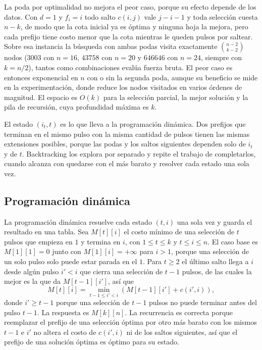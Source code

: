La poda por optimalidad no mejora el peor caso, porque su efecto depende de los datos. Con $d = 1$ y $f_i = i$ todo salto $c(i,j)$ vale $j - i - 1$ y toda selección cuesta $n - k$, de modo que la cota inicial ya es óptima y ninguna hoja la mejora, pero cada prefijo tiene costo menor que la cota mientras le queden pulsos por saltear. Sobre esa instancia la búsqueda con ambas podas visita exactamente $\binom{n-2}{k-2}$ nodos ($3003$ con $n = 16$, $\num{43758}$ con $n = 20$ y $\num{646646}$ con $n = 24$, siempre con $k = n/2$), tantos como combinaciones evalúa fuerza bruta. El peor caso es entonces exponencial en $n$ con o sin la segunda poda, aunque su beneficio se mide en la experimentación, donde reduce los nodos visitados en varios órdenes de magnitud. El espacio es $O(k)$ para la selección parcial, la mejor solución y la pila de recursión, cuya profundidad máxima es $k$.

El estado $(i_t, t)$ es lo que lleva a la programación dinámica. Dos prefijos que terminan en el mismo pulso con la misma cantidad de pulsos tienen las mismas extensiones posibles, porque las podas y los saltos siguientes dependen solo de $i_t$ y de $t$. Backtracking los explora por separado y repite el trabajo de completarlos, cuando alcanza con quedarse con el más barato y resolver cada estado una sola vez.

\subsection{Programación dinámica}
\label{sec:pd}

La programación dinámica resuelve cada estado $(t, i)$ una sola vez y guarda el resultado en una tabla. Sea $M[t][i]$ el costo mínimo de una selección de $t$ pulsos que empieza en $1$ y termina en $i$, con $1 \le t \le k$ y $t \le i \le n$. El caso base es $M[1][1] = 0$ junto con $M[1][i] = +\infty$ para $i > 1$, porque una selección de un solo pulso solo puede estar parada en el $1$. Para $t \ge 2$ el último salto llega a $i$ desde algún pulso $i' < i$ que cierra una selección de $t-1$ pulsos, de las cuales la mejor es la que da $M[t-1][i']$, así que
\begin{equation}
M[t][i] = \min_{t-1 \le i' < i} \left( M[t-1][i'] + c(i', i) \right),
\label{eq:pd}
\end{equation}
donde $i' \ge t-1$ porque una selección de $t-1$ pulsos no puede terminar antes del pulso $t-1$. La respuesta es $M[k][n]$. La recurrencia es correcta porque reemplazar el prefijo de una selección óptima por otro más barato con los mismos $t-1$ e $i'$ no altera el costo de $c(i', i)$ ni de los saltos siguientes, así que el prefijo de una solución óptima es óptimo para su estado.

